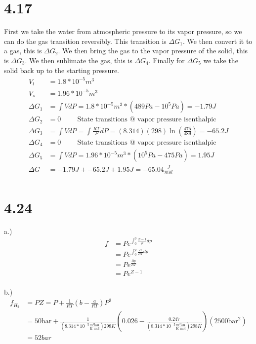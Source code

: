 \documentclass[10pt]{article} %
\begin{document}
\section{4.17}
First we take the water from atmospheric pressure to its vapor pressure, so we can do the gas transition reversibly. This transition is $\Delta G_1$. We then convert it to a gas, this is $\Delta G_2$. We then bring the gas to the vapor pressure of the solid, this is $\Delta G_3$. We then sublimate the gas, this is $\Delta G_4$. Finally for $\Delta G_5$ we take the solid back up to the starting pressure.
\begin{align*}
  V_l &= 1.8*10^{-5} m^3\\
  V_s &= 1.96*10^{-5} m^3\\
  \Delta G_1 &= \int VdP = 1.8*10^{-5} m^3 * \left(489Pa - 10^5 Pa\right) = -1.79J\\
  \Delta G_2 &= 0 \hspace{1cm}\mbox{State transitions @ vapor pressure isenthalpic}\\
  \Delta G_3 &= \int VdP = \int \frac{RT}{P}dP = (8.314)(298)\ln\left(\frac{475}{489}\right) = -65.2J\\
  \Delta G_4 &= 0 \hspace{1cm}\mbox{State transitions @ vapor pressure isenthalpic}\\
  \Delta G_5 &= \int VdP = 1.96*10^{-5} m^3 * \left(10^5Pa - 475Pa\right) = 1.95J\\
  \Delta G &= -1.79J + -65.2J + 1.95J = -65.04\frac{J}{mol}\\
\end{align*}

\section{4.24}
a.)
\begin{align*}
  f &= Pe^{\int_0^p \frac{Z-1}{p}dp}\\
  &= Pe^{\int_0^p \frac{B}{RT}dp}\\
  &= Pe^{\frac{Bp}{RT}}\\
  &= Pe^{Z-1}\\
\end{align*}

b.)
\begin{align*}
  f_{H_2} &= PZ = P + \frac{1}{RT}\left(b - \frac{a}{RT}\right)P^2\\
  &= 50 \mbox{bar} + \frac{1}{\left(8.314*10^{-5} \frac{m^3 \mbox{bar}}{\mbox{K mol}}\right)298K}\left(0.026  - \frac{0.247}{\left(8.314*10^{-5} \frac{m^3 \mbox{bar}}{\mbox{K mol}}\right)298K}\right)\left(2500 \mbox{bar}^2\right)\\
  &= 52 bar\\
\end{align*}
\end{document}

